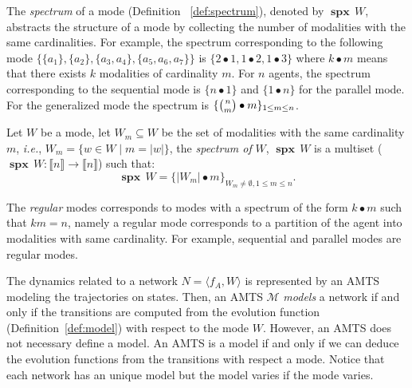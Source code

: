 \documentclass[12pt]{elsarticle}
\newcommand{\tuple}[1]{\langle #1 \rangle}
\newcommand{\abbrev}[1]{#1, \relax}
\newcommand{\ie}[0]{\abbrev{\textit{i.e.}}}
\newcommand{\spectrum}[0]{{\operatorname{\textbf{spx}}\,}}
\begin{document}
The \emph{spectrum} of a mode (Definition~ \ref{def:spectrum}), denoted by $\spectrum W$, abstracts the structure of a mode by collecting the number of modalities with the same cardinalities. For example, the spectrum corresponding to the following mode $\{\{a_1\}, \{a_2\}, \{a_3,a_4\},\{a_5,a_6,a_7\} \}$ is $\{2\bullet 1,1\bullet 2,1\bullet 3\}$ where $k \bullet m$ means that there exists $k$ modalities of cardinality $m$. For $n$ agents, the spectrum corresponding to the sequential mode is $\{n \bullet 1\}$ and $\{1\bullet n\}$ for the parallel mode. 
For the generalized mode the spectrum is $\{ \tbinom{n}{m}\bullet m\}_{1 \leq m \leq n}$. 

\begin{definition}
\label{def:spectrum}
Let $W$ be a mode, let $W_{m} \subseteq W$ be the set of modalities with the same cardinality $m$, \ie $W_m = \{ w \in W \mid m =|w|\}$, the \emph{spectrum of} $W$, $\spectrum W$ is a multiset ($\spectrum W: \llbracket n \rrbracket \to \llbracket n \rrbracket$) such that: 
$$ \spectrum W = \{ |W_m| \bullet m  \}_{ W_m \neq \emptyset,  1 \leq m \leq n}.$$

\end{definition}
The \emph{regular} modes corresponds to modes with a spectrum of the form $k \bullet m$ such that $km=n$, namely a regular mode corresponds to a partition of the agent into modalities with same cardinality. For example, sequential and parallel modes are regular modes.

The dynamics related to a network $N=\tuple{f_A,W}$ is represented by an AMTS modeling the trajectories on states. Then, an AMTS $\mathcal M$ \emph{models} a network if and only if the transitions are computed from the evolution function (Definition~\ref{def:model}) with respect to the mode $W$. However, an AMTS does not necessary define a model. An AMTS is a model if and only if we can deduce the evolution functions from the transitions with respect a mode. Notice that each network has an unique model but the model varies if the mode varies.
\end{document}

